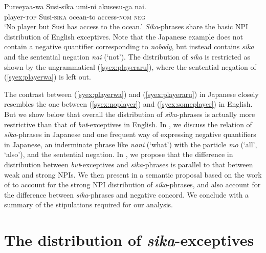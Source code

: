 \documentclass[output=paper]{langscibook}
\begin{document}
\ea \label{syex:playerwa}
\gll Pureeyaa-wa Susi-sika umi-ni akusesu-ga nai.\\
player-\textsc{top} Susi-\textsc{sika} ocean-to access-\textsc{nom} \textsc{neg}\\
\glt `No player but Susi has access to the ocean.'\z
%
\emph{Sika}-phrases share the basic NPI distribution of English exceptives.
Note that the Japanese example does not contain a negative quantifier corresponding to \emph{nobody}, but instead contains \emph{sika} and the sentential negation \emph{nai} (`not').  The distribution of \emph{sika} is restricted as shown by the ungrammatical (\ref{syex:playeraru}), where the sentential negation of (\ref{syex:playerwa}) is left out.

\z


The contrast between (\ref{syex:playerwa}) and (\ref{syex:playeraru}) in Japanese closely resembles the one between (\ref{syex:noplayer}) and (\ref{syex:someplayer}) in English.
But we show below that overall the distribution of \emph{sika}-phrases is actually more restrictive than that of \emph{but}-exceptives in English. In , we discuss the relation of \emph{sika}-phrases in Japanese and one frequent way of expressing negative quantifiers in Japanese, an inderminate phrase like \emph{nani} (`what') with the particle \emph{mo} (`all', `also'), and the sentential negation.
In , we propose that the difference in distribution between \emph{but}-exceptives and \emph{sika}-phrases is parallel to that between weak and strong NPIs.
We then present in  a semantic proposal based on the work of \citet{gajewski11a} to account for the strong NPI distribution of \emph{sika}-phrases, and also account for the difference between \emph{sika}-phrases and negative concord.  We conclude with a summary of the stipulations required for our analysis.



\section{The distribution of \emph{sika}-exceptives}\label{sysc:data}
\end{document}
